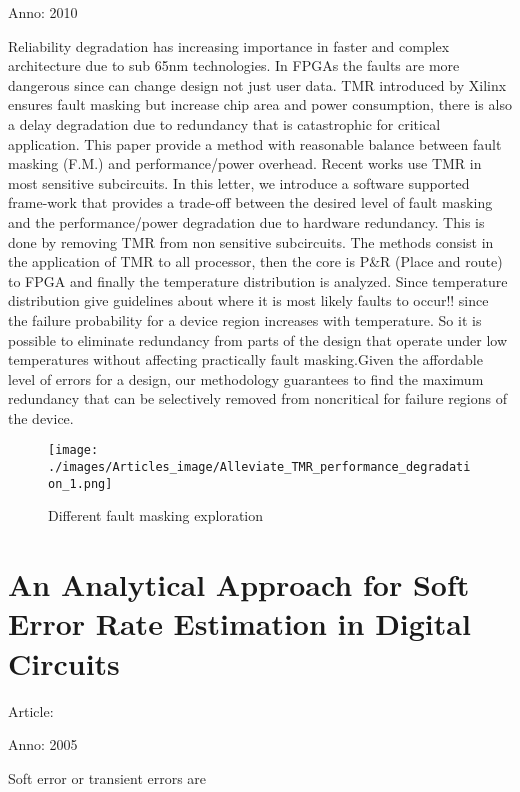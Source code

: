 {{		Anno: 2010
		
		Reliability degradation has increasing importance in faster and complex architecture due to sub 65nm technologies. In FPGAs the faults are more dangerous since can change design not just user data. TMR introduced by Xilinx ensures fault masking but increase chip area and power consumption, there is also a delay degradation due to redundancy that is catastrophic for critical application. This paper provide a method with reasonable balance between fault masking (F.M.) and performance/power overhead. Recent works use TMR in most sensitive subcircuits.   
		In this letter, we introduce a software supported frame-work that provides a trade-off between the desired level of fault masking and the performance/power degradation due to hardware redundancy. This is done by removing TMR from non sensitive subcircuits. The methods consist in the application of TMR to all processor, then the core is P\&R (Place and route) to FPGA and finally the temperature distribution is analyzed. Since temperature distribution give guidelines about where it is most likely faults to occur!! since the failure probability for a device region increases with temperature. So it is possible to eliminate redundancy from parts of the design that operate under low temperatures without affecting practically fault masking.Given the affordable level of errors for a design, our methodology guarantees to find the maximum redundancy that can be selectively removed from noncritical for failure regions of the device.
		\begin{figure}[H]
			\centering
			\texttt{[image: ./images/Articles\_image/Alleviate\_TMR\_performance\_degradation\_1.png]}
			\caption{Different fault masking exploration}
			\label{Interface}
		\end{figure}
	}
	\section{An Analytical Approach for Soft Error Rate Estimation in Digital Circuits}{
		Article: \cite{SER_estimation_analytical}
		
		Anno: 2005
		
		Soft error or transient errors are	
	}
}